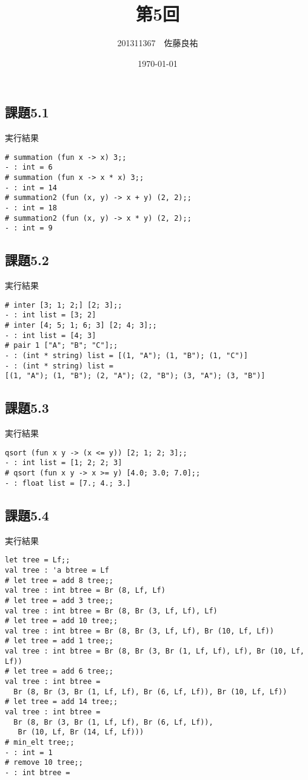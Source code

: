\documentclass[11pt,a4j]{jarticle}
\title{第5回}
\author{201311367　佐藤良祐}
\date{\today}
\begin{document}
\subsection*{課題5.1}

実行結果
\begin{lstlisting}
# summation (fun x -> x) 3;;
- : int = 6
# summation (fun x -> x * x) 3;;
- : int = 14
# summation2 (fun (x, y) -> x + y) (2, 2);;
- : int = 18
# summation2 (fun (x, y) -> x * y) (2, 2);;
- : int = 9
\end{lstlisting}
\subsection*{課題5.2}


実行結果
\begin{lstlisting}
# inter [3; 1; 2;] [2; 3];;
- : int list = [3; 2]
# inter [4; 5; 1; 6; 3] [2; 4; 3];; 
- : int list = [4; 3]
# pair 1 ["A"; "B"; "C"];;
- : (int * string) list = [(1, "A"); (1, "B"); (1, "C")]
- : (int * string) list =
[(1, "A"); (1, "B"); (2, "A"); (2, "B"); (3, "A"); (3, "B")]
\end{lstlisting}
\subsection*{課題5.3}

実行結果
 \begin{lstlisting}
qsort (fun x y -> (x <= y)) [2; 1; 2; 3];;
- : int list = [1; 2; 2; 3]
# qsort (fun x y -> x >= y) [4.0; 3.0; 7.0];;
- : float list = [7.; 4.; 3.]  
 \end{lstlisting}
\subsection*{課題5.4}

実行結果
 \begin{lstlisting}
let tree = Lf;;
val tree : 'a btree = Lf
# let tree = add 8 tree;;
val tree : int btree = Br (8, Lf, Lf)
# let tree = add 3 tree;;
val tree : int btree = Br (8, Br (3, Lf, Lf), Lf)
# let tree = add 10 tree;;
val tree : int btree = Br (8, Br (3, Lf, Lf), Br (10, Lf, Lf))
# let tree = add 1 tree;;
val tree : int btree = Br (8, Br (3, Br (1, Lf, Lf), Lf), Br (10, Lf, Lf))
# let tree = add 6 tree;;
val tree : int btree =
  Br (8, Br (3, Br (1, Lf, Lf), Br (6, Lf, Lf)), Br (10, Lf, Lf))
# let tree = add 14 tree;;
val tree : int btree =
  Br (8, Br (3, Br (1, Lf, Lf), Br (6, Lf, Lf)),
   Br (10, Lf, Br (14, Lf, Lf)))
# min_elt tree;;
- : int = 1
# remove 10 tree;;
- : int btree =
 \end{lstlisting}
\end{document}
